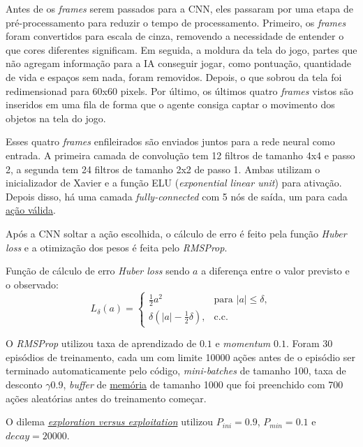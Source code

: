 Antes de os \textit{frames} serem passados para a CNN, eles passaram por uma etapa de pré-processamento para reduzir o tempo de processamento.
Primeiro, os \textit{frames} foram convertidos para escala de cinza, removendo a necessidade de entender o que cores diferentes significam.
Em seguida, a moldura da tela do jogo, partes que não agregam informação para a IA conseguir jogar, como pontuação, quantidade de vida e espaços sem nada, foram removidos.
Depois, o que sobrou da tela foi redimensionad para 60x60 pixels.
Por último, os últimos quatro \textit{frames} vistos são inseridos em uma fila de forma que o agente consiga captar o movimento dos objetos na tela do jogo.

Esses quatro \textit{frames} enfileirados são enviados juntos para a rede neural como entrada.
A primeira camada de convolução tem 12 filtros de tamanho 4x4 e passo 2, a segunda tem 24 filtros de tamanho 2x2 de passo 1.
Ambas utilizam o inicializador de Xavier e a função ELU (\textit{exponential linear unit}) para ativação.
Depois disso, há uma camada \textit{fully-connected} com 5 nós de saída, um para cada \hyperref[sec:asteroids]{ação válida}.

Após a CNN soltar a ação escolhida, o cálculo de erro é feito pela função \textit{Huber loss} e a otimização dos pesos é feita pelo \textit{RMSProp}.

Função de cálculo de erro \textit{Huber loss} sendo $a$ a diferença entre o valor previsto e o observado:
\begin{equation} \label{eq:huber}
L_{\delta}(a) = 
\begin{cases}
\frac{1}{2}a^{2} & \text{para } |a| \leq \delta,\\
\delta(|a| - \frac{1}{2}\delta), & \text{c.c.}
\end{cases}
\end{equation}


O \textit{RMSProp} utilizou taxa de aprendizado de $0.1$ e \textit{momentum} $0.1$.
Foram 30 episódios de treinamento, cada um com limite 10000 ações antes de o episódio ser terminado automaticamente pelo código, \textit{mini-batches} de tamanho 100, taxa de desconto $\gamma 0.9$, \textit{buffer} de \hyperref[sec:er]{memória} de tamanho 1000 que foi preenchido com 700 ações aleatórias antes do treinamento começar.

O dilema \hyperref[eq:exp_exp_prob]{\textit{exploration versus exploitation}} utilizou $P_{ini} = 0.9$, $P_{min} = 0.1$ e $decay = 20000$.


